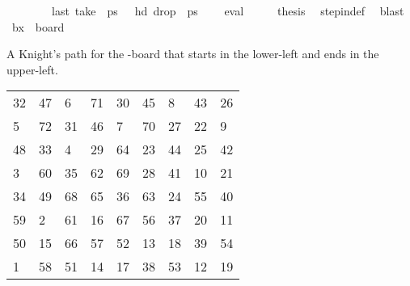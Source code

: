 \begin{isabellebody}
\ \ \ \ \ \ \ \ {\isachardoublequoteopen}last\ {\isacharparenleft}{\kern0pt}take\ {}\ {\isacharquery}{\kern0pt}ps{\isacharparenright}{\kern0pt}\ {\isacharequal}{\kern0pt}\ {\isacharparenleft}{\kern0pt}{}{\isacharcomma}{\kern0pt}{}{\isacharparenright}{\kern0pt}{\isachardoublequoteclose}\ {\isachardoublequoteopen}hd\ {\isacharparenleft}{\kern0pt}drop\ {}\ {\isacharquery}{\kern0pt}ps{\isacharparenright}{\kern0pt}\ {\isacharequal}{\kern0pt}\ {\isacharparenleft}{\kern0pt}{}{\isacharcomma}{\kern0pt}{}{\isacharparenright}{\kern0pt}{\isachardoublequoteclose}\ \isamarkupfalse%
\ eval{\isacharplus}{\kern0pt}\isanewline
\ \ \isamarkupfalse%
\ \isamarkupfalse%
\ {\isacharquery}{\kern0pt}thesis\ \isamarkupfalse%
\ step{\isacharunderscore}{\kern0pt}in{\isacharunderscore}{\kern0pt}def\ \isamarkupfalse%
\ blast\isanewline
{}\isamarkupfalse%
%
\endisatagproof
{\isafoldproof}%
%
\isadelimproof
\isanewline
%
\endisadelimproof
\isanewline
{}\isamarkupfalse%
\ {\isachardoublequoteopen}b{}x{}\ {\isasymequiv}\ board\ {}\ {}{\isachardoublequoteclose}%
\begin{isamarkuptext}%
A Knight's path for the -board that starts in the lower-left and ends in the 
upper-left.
  \begin{table}[H]
    \begin{tabular}{lllllllll}
      32 & 47 &  6 & 71 & 30 & 45 &  8 & 43 & 26 \\
       5 & 72 & 31 & 46 &  7 & 70 & 27 & 22 &  9 \\
      48 & 33 &  4 & 29 & 64 & 23 & 44 & 25 & 42 \\
       3 & 60 & 35 & 62 & 69 & 28 & 41 & 10 & 21 \\
      34 & 49 & 68 & 65 & 36 & 63 & 24 & 55 & 40 \\
      59 &  2 & 61 & 16 & 67 & 56 & 37 & 20 & 11 \\
      50 & 15 & 66 & 57 & 52 & 13 & 18 & 39 & 54 \\
       1 & 58 & 51 & 14 & 17 & 38 & 53 & 12 & 19
    \end{tabular}
  \end{table}%
\end{isamarkuptext}\isamarkuptrue%
\isamarkupfalse%

\end{isabellebody}
